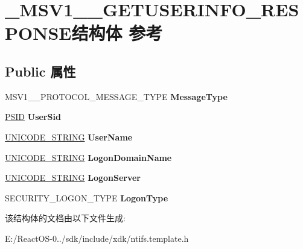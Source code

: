 \hypertarget{struct___m_s_v1__0___g_e_t_u_s_e_r_i_n_f_o___r_e_s_p_o_n_s_e}{}\section{\+\_\+\+M\+S\+V1\+\_\+\_\+\+G\+E\+T\+U\+S\+E\+R\+I\+N\+F\+O\+\_\+\+R\+E\+S\+P\+O\+N\+S\+E结构体 参考}
\label{struct___m_s_v1__0___g_e_t_u_s_e_r_i_n_f_o___r_e_s_p_o_n_s_e}
\subsection*{Public 属性}
\begin{DoxyCompactItemize}
\item 
\mbox{\label{struct___m_s_v1__0___g_e_t_u_s_e_r_i_n_f_o___r_e_s_p_o_n_s_e_a5380fbe85b075496103ea440b86d5cf7}} 
M\+S\+V1\+\_\+\_\+\+P\+R\+O\+T\+O\+C\+O\+L\+\_\+\+M\+E\+S\+S\+A\+G\+E\+\_\+\+T\+Y\+PE {\bfseries Message\+Type}
\item 
\mbox{\label{struct___m_s_v1__0___g_e_t_u_s_e_r_i_n_f_o___r_e_s_p_o_n_s_e_ac4020f077122be6cb48f0198f83d10fb}} 
\hyperlink{struct___s_i_d}{P\+S\+ID} {\bfseries User\+Sid}
\item 
\mbox{\label{struct___m_s_v1__0___g_e_t_u_s_e_r_i_n_f_o___r_e_s_p_o_n_s_e_a8d73a9c88a44db5a233cc43eca2be4fe}} 
\hyperlink{struct___u_n_i_c_o_d_e___s_t_r_i_n_g}{U\+N\+I\+C\+O\+D\+E\+\_\+\+S\+T\+R\+I\+NG} {\bfseries User\+Name}
\item 
\mbox{\label{struct___m_s_v1__0___g_e_t_u_s_e_r_i_n_f_o___r_e_s_p_o_n_s_e_af18e5b5e74a06fb6eb3207d1b044b527}} 
\hyperlink{struct___u_n_i_c_o_d_e___s_t_r_i_n_g}{U\+N\+I\+C\+O\+D\+E\+\_\+\+S\+T\+R\+I\+NG} {\bfseries Logon\+Domain\+Name}
\item 
\mbox{\label{struct___m_s_v1__0___g_e_t_u_s_e_r_i_n_f_o___r_e_s_p_o_n_s_e_aaae1ece235fab8e689159c4b56008942}} 
\hyperlink{struct___u_n_i_c_o_d_e___s_t_r_i_n_g}{U\+N\+I\+C\+O\+D\+E\+\_\+\+S\+T\+R\+I\+NG} {\bfseries Logon\+Server}
\item 
\mbox{\label{struct___m_s_v1__0___g_e_t_u_s_e_r_i_n_f_o___r_e_s_p_o_n_s_e_ae27a66b5dac31f5f83125892a06264fe}} 
S\+E\+C\+U\+R\+I\+T\+Y\+\_\+\+L\+O\+G\+O\+N\+\_\+\+T\+Y\+PE {\bfseries Logon\+Type}
\end{DoxyCompactItemize}


该结构体的文档由以下文件生成\+:\begin{DoxyCompactItemize}
\item 
E\+:/\+React\+O\+S-\/0../sdk/include/xdk/ntifs.\+template.\+h\end{DoxyCompactItemize}
